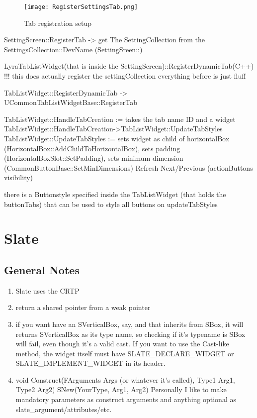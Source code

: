             \begin{figure}
                \texttt{[image: RegisterSettingsTab.png]}
                \caption{Tab registration setup}
                \label{}
            \end{figure}
        
        SettingScreen::RegisterTab -> get The SettingCollection from the SettingsCollection::DevName (SettingSreen::)
        
        LyraTabListWidget(that is inside the SettingScreen)::RegisterDynamicTab(C++) !!! this does actually register the settingCollection
        everything before is just fluff
        
        TabListWidget::RegisterDynamicTab -> UCommonTabListWidgetBase::RegisterTab
        
        TabListWidget::HandleTabCreation := takes the tab name ID and a widget
        TabListWidget::HandleTabCreation->TabListWidget::UpdateTabStyles
        TabListWidget::UpdateTabStyles := sets widget as child of horizontalBox (HorizontalBox::AddChildToHorizontalBox), sets padding (HorizontalBoxSlot::SetPadding), sets minimum dimension (CommonButtonBase::SetMinDimensions)
        Refresh Next/Previous (actionButtons visibility)
        
        there is a Buttonstyle specified inside the TabListWidget (that holds the buttonTabs) that can be used to style all buttons on updateTabStyles
        
\chapter{Slate}

    \section{General Notes}
        \begin{enumerate}
            \item Slate uses the \glsdesc{CRTP}
            \item {} return a shared pointer from a weak pointer
            \item if you want have an SVerticalBox, say, and that inherits from SBox, it will returns SVerticalBox as its type name, so checking if it's typename is SBox will fail, even though it's a valid cast.
            If you want to use the Cast-like method, the widget itself must have SLATE\_DECLARE\_WIDGET or SLATE\_IMPLEMENT\_WIDGET in its header.
            \item void Construct(FArguments Args (or whatever it's called), Type1 Arg1, Type2 Arg2)
            SNew(YourType, Arg1, Arg2) 
            Personally I like to make mandatory parameters as construct arguments and anything optional as slate\_argument/attributes/etc. 
            
        \end{enumerate}

